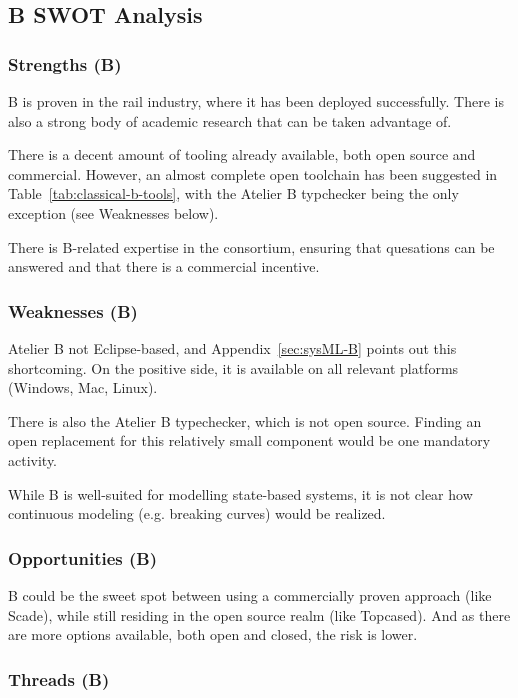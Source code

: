 \subsection{B SWOT Analysis}

\subsubsection{Strengths (B)}

B is proven in the rail industry, where it has been deployed successfully.  There is also a strong body of academic research that can be taken advantage of.

There is a decent amount of tooling already available, both open source and commercial.  However, an almost complete open toolchain has been suggested in Table~\ref{tab:classical-b-tools}, with the Atelier B typchecker being the only exception (see Weaknesses below).

There is B-related expertise in the consortium, ensuring that quesations can be answered and that there is a commercial incentive.

\subsubsection{Weaknesses (B)}

Atelier B not Eclipse-based, and Appendix~\ref{sec:sysML-B} points out this shortcoming.  On the positive side, it is available on all relevant platforms (Windows, Mac, Linux).

There is also the Atelier B typechecker, which is not open source.  Finding an open replacement for this relatively small component would be one mandatory activity.

While B is well-suited for modelling state-based systems, it is not clear how continuous modeling (e.g. breaking curves) would be realized.


\subsubsection{Opportunities (B)}

B could be the sweet spot between using a commercially proven approach (like Scade), while still residing in the open source realm (like Topcased).  And as there are more options available, both open and closed, the risk is lower.

\subsubsection{Threads (B)}


